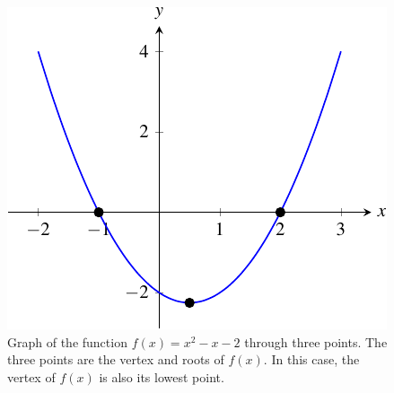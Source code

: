 \documentclass[a4paper,oneside,12pt]{article}
\begin{document}
\begin{figure}[!htbp]
\centering
\includegraphics[scale=1]{image/08/a1-bminus1-cminus2.pdf}
\caption{%
  Graph of the function $f(x) = x^2 - x - 2$ through three points.
  The three points are the vertex and roots of $f(x)$.  In this case,
  the vertex of $f(x)$ is also its lowest point.
}
\label{fig:a1_bminus1_cminus2}
\end{figure}
\end{document}
